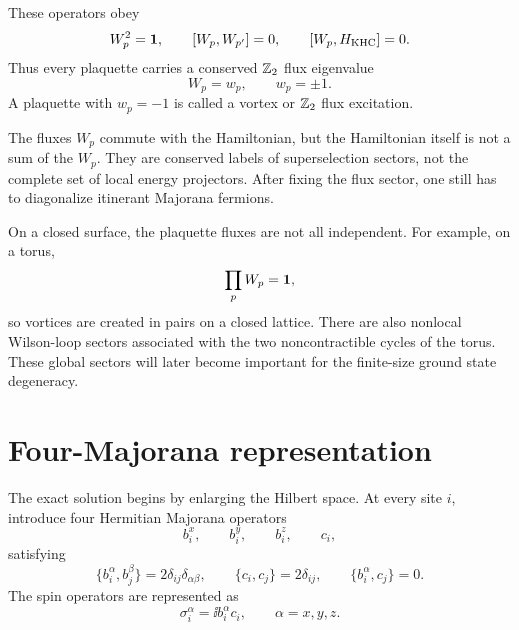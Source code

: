 These operators obey
\begin{equation}
\label{eq:kitaev-flux-algebra-spin}
    W_p^2=\mathbf{1},
    \qquad
    [W_p,W_{p'}]=0,
    \qquad
    [W_p,H_{\rm KHC}]=0 .
\end{equation}
Thus every plaquette carries a conserved \(\mathbb{Z}_2\) flux eigenvalue
\begin{equation}
\label{eq:kitaev-flux-eigenvalue}
    W_p=w_p,
    \qquad
    w_p=\pm1 .
\end{equation}
A plaquette with \(w_p=-1\) is called a vortex or \(\mathbb{Z}_2\) flux excitation.

\begin{remark}
The fluxes \(W_p\) commute with the Hamiltonian, but the Hamiltonian itself is
not a sum of the \(W_p\).  They are conserved labels of superselection sectors,
not the complete set of local energy projectors.  After fixing the flux sector,
one still has to diagonalize itinerant Majorana fermions.
\end{remark}

On a closed surface, the plaquette fluxes are not all independent.  For example,
on a torus,
\begin{equation}
\label{eq:kitaev-product-flux-constraint}
    \prod_p W_p=\mathbf{1},
\end{equation}
so vortices are created in pairs on a closed lattice.  There are also nonlocal
Wilson-loop sectors associated with the two noncontractible cycles of the torus.
These global sectors will later become important for the finite-size ground
state degeneracy.

\section{Four-Majorana representation}
\label{sec:kitaev-four-majorana-representation}

The exact solution begins by enlarging the Hilbert space.  At every site \(i\),
introduce four Hermitian Majorana operators
\begin{equation}
\label{eq:kitaev-four-majoranas}
    b_i^x,
    \qquad
    b_i^y,
    \qquad
    b_i^z,
    \qquad
    c_i,
\end{equation}
satisfying
\begin{equation}
\label{eq:kitaev-majorana-algebra}
    \{b_i^\alpha,b_j^\beta\}=2\delta_{ij}\delta_{\alpha\beta},
    \qquad
    \{c_i,c_j\}=2\delta_{ij},
    \qquad
    \{b_i^\alpha,c_j\}=0 .
\end{equation}
The spin operators are represented as
\begin{equation}
\label{eq:kitaev-spin-majorana-representation}
    \sigma_i^\alpha=\ii b_i^\alpha c_i,
    \qquad
    \alpha=x,y,z .
\end{equation}

